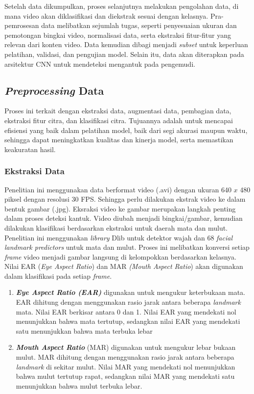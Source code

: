   
    Setelah data dikumpulkan, proses selanjutnya melakukan pengolahan data, di mana video akan diklasifikasi dan diekstrak sesuai dengan kelasnya. Pra-pemrosesan data melibatkan sejumlah tugas, seperti penyesuaian ukuran dan pemotongan bingkai video, normalisasi data, serta ekstraksi fitur-fitur yang relevan dari konten video. Data kemudian dibagi menjadi \textit{subset} untuk keperluan pelatihan, validasi, dan pengujian model. Selain itu, data akan diterapkan pada arsitektur CNN untuk mendeteksi mengantuk pada pengemudi.
    
\subsection{\textit{Preprocessing }Data}
   
    Proses ini terkait dengan ekstraksi data, augmentasi data, pembagian data, ekstraksi fitur citra, dan klasifikasi citra. Tujuannya adalah untuk mencapai efisiensi yang baik dalam pelatihan model, baik dari segi akurasi maupun waktu, sehingga dapat meningkatkan kualitas dan kinerja model, serta memastikan keakuratan hasil.
    
  
\subsubsection{Ekstraksi Data}
    Penelitian ini menggunakan data berformat video (.avi) dengan ukuran 640 $x$ 480 piksel dengan resolusi 30 FPS. Sehingga perlu dilakukan  ekstrak video ke dalam bentuk gambar (.jpg). Eksraksi video ke gambar merupakan langkah penting dalam proses deteksi kantuk. Video diubah menjadi bingkai/gambar, kemudian dilakukan klasifikasi berdasarkan ekstraksi untuk daerah mata dan mulut. Penelitian ini menggunakan \textit{library} Dlib untuk detektor wajah dan 68 \textit{facial landmark predictors} untuk mata dan mulut. Proses ini melibatkan konversi setiap \textit{frame} video menjadi gambar langsung di kelompokkan berdasarkan kelasnya. Nilai EAR (\textit{Eye Aspect Ratio}) dan MAR \textit{(Mouth Aspect Ratio}) akan digunakan dalam klasifikasi pada setiap \textit{frame}.
    
    \begin{enumerate}
        \item     \textit{\textbf{Eye Aspect Ratio (EAR)}} digunakan untuk mengukur keterbukaan mata. EAR dihitung dengan menggunakan rasio jarak antara beberapa\textit{ landmark }mata. Nilai EAR berkisar antara 0 dan 1. Nilai EAR yang mendekati nol menunjukkan bahwa mata tertutup, sedangkan nilai EAR yang mendekati satu menunjukkan bahwa mata terbuka lebar

        \item \textbf{\textit{Mouth Aspect Ratio }}(MAR) digunakan untuk mengukur lebar bukaan mulut. MAR dihitung dengan menggunakan rasio jarak antara beberapa \textit{landmark} di sekitar mulut. Nilai MAR yang mendekati nol menunjukkan bahwa mulut tertutup rapat, sedangkan nilai MAR yang mendekati satu menunjukkan bahwa mulut terbuka lebar. 
    \end{enumerate}

